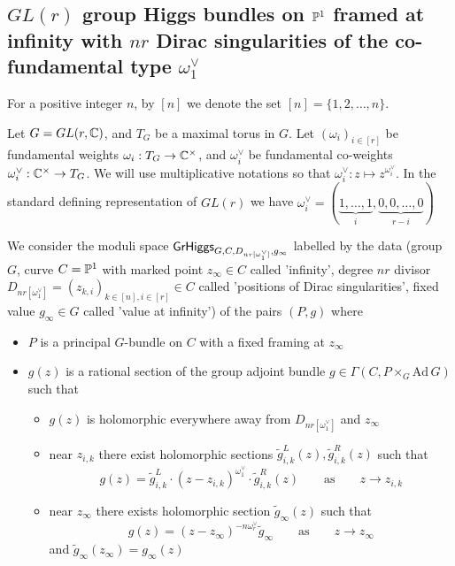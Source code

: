 \documentclass[12pt,psamsfonts,reqno]{amsart}
\begin{document}
\subsection{ $GL(r)$ group Higgs bundles on $\mathbb P^1$ framed at infinity with $nr$ Dirac
 singularities of the co-fundamental type $\omega_1^{\vee}$}

For a positive  integer $n$, by $[n]$ we denote the set $[n] = \{1,2,\dots, n \}$.


Let $G = GL(r, \mathbb C)$, and $T_{G}$ be a maximal torus in $G$.
Let $(\omega_i)_{i \in [r]}$ be fundamental weights $\omega_i: T_{G} \to \mathbb C^{\times}$,
and $\omega_i^{\vee}$ be fundamental co-weights $\omega_i^{\vee}: \mathbb C^{\times} \to T_{G}$. We will use
multiplicative notations so that $\omega_i^{\vee}: z \mapsto z^{\omega_{i}^{\vee}}$.
In the standard defining representation of $GL(r)$ we have  $\omega_i^{\vee} = (\underbrace{1, \dots, 1}_{i},
\underbrace{0, 0, \dots, 0}_{r-i})$



\begin{definition} \label{de:GLrn}
  
  We consider the moduli space $\mathsf{GrHiggs}_{G,C,D_{nr[\omega_1^{\vee}]},g_\infty}$  
  labelled by the data (group $G$, curve $C = \mathbb P^1$ with marked point $z_\infty \in C$ called 'infinity',
  degree $nr$ divisor $D_{nr[\omega_1^{\vee}]} = (z_{k,i})_{k \in [n], i \in [r]} \in C$ called
  'positions of Dirac singularities', fixed value $g_{\infty} \in G$ called 'value at infinity') of the pairs
  $(P,g)$ where 
\begin{itemize}
\item $P$ is a principal $G$-bundle on $C$ with a fixed framing at $z_{\infty}$
\item $g(z)$ is a rational section of the group adjoint bundle $g \in \Gamma(C, P \times_{G} \mathrm{Ad} \, G)$
  such that 
  \begin{itemize}
  \item $g(z)$ is holomorphic everywhere away from $D_{nr[\omega_1^{\vee}]}$ and $z_\infty$
  \item near $z_{i,k}$ there exist holomorphic sections $\tilde g_{i,k}^{L}(z), \tilde g_{i,k}^{R}(z) $ such that
    \begin{equation}
     g(z) = \tilde g_{i,k}^{L} \cdot (z - z_{i,k})^{\omega_1^{\vee}} \cdot \tilde g_{i,k}^{R} (z) \qquad \text{as} \qquad z \to z_{i,k}
    \end{equation}
 \item near $z_{\infty}$ there exists holomorphic section $\tilde g_{\infty}(z)$
   such that 
   \begin{equation}
     g(z) = (z-z_{\infty})^{-n \omega_{r}^{\vee}} \tilde g_{\infty} \qquad \text{as} \qquad z \to z_\infty
   \end{equation}
   and $\tilde g_\infty(z_{\infty}) = g_\infty(z)$
  \end{itemize}
\end{itemize}
\end{definition}
\end{document}
